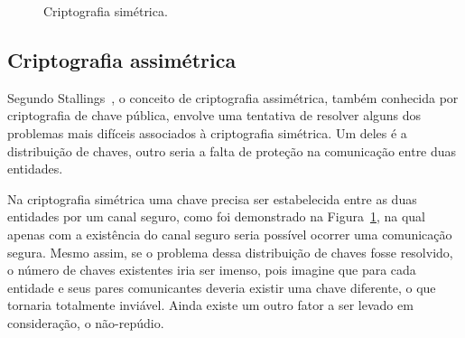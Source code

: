 \documentclass{article}
\begin{document}
\begin{figure}[!ht]
  \centering
  \caption{Criptografia simétrica.}\label{fig:2}
\end{figure}

\subsection{Criptografia assimétrica}\label{subsec:asymmetric}

Segundo Stallings~\cite{Stallings:book:2016}, o conceito de criptografia
assimétrica, também conhecida por criptografia de chave pública, envolve uma
tentativa de resolver alguns dos problemas mais difíceis associados à
criptografia simétrica. Um deles é a distribuição de chaves, outro seria a
falta de proteção na comunicação entre duas entidades.

Na criptografia simétrica uma chave precisa ser estabelecida entre as duas
entidades por um canal seguro, como foi demonstrado na Figura~\ref{fig:2}, na
qual apenas com a existência do canal seguro seria possível ocorrer uma
comunicação segura. Mesmo assim, se o problema dessa distribuição de chaves
fosse resolvido, o número de chaves existentes iria ser imenso, pois imagine
que para cada entidade e seus pares comunicantes deveria existir uma chave
diferente, o que tornaria totalmente inviável. Ainda existe um outro fator a
ser levado em consideração, o não-repúdio.
\end{document}
